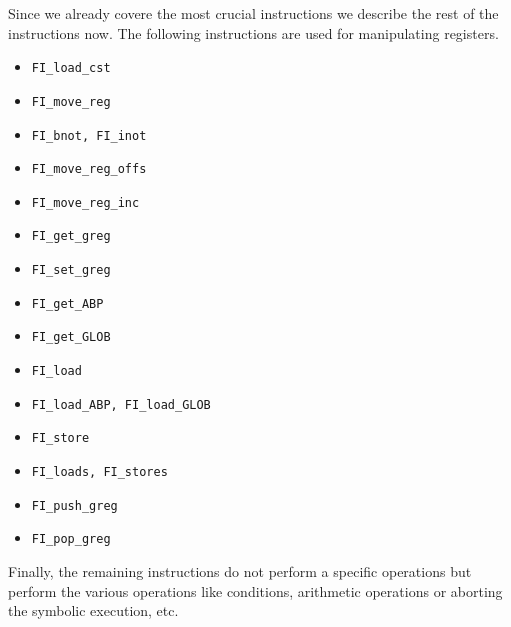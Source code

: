 Since we already covere the most crucial instructions we describe
the rest of the instructions now.
The following instructions are used for manipulating registers.

\begin{itemize}

	\item {\tt FI\_load\_cst}

	\item {\tt FI\_move\_reg}

	\item {\tt FI\_bnot, FI\_inot}

	\item {\tt FI\_move\_reg\_offs}

	\item {\tt FI\_move\_reg\_inc}

	\item {\tt FI\_get\_greg}

	\item {\tt FI\_set\_greg}

	\item {\tt FI\_get\_ABP}

	\item {\tt FI\_get\_GLOB}

	\item {\tt FI\_load}
	
	\item {\tt FI\_load\_ABP, FI\_load\_GLOB}
	
	\item {\tt FI\_store}

	\item {\tt FI\_loads, FI\_stores}

	\item {\tt FI\_push\_greg}
	
	\item {\tt FI\_pop\_greg}

	\end{itemize}

	Finally, the remaining instructions do not perform a specific operations
	but perform the various operations like conditions, arithmetic operations or
	aborting the symbolic execution, etc.

